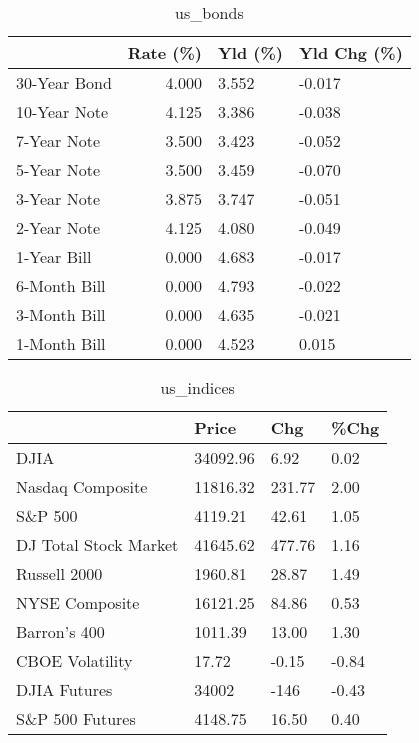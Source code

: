\documentclass{article}%
\begin{document}
\begin{table}[htbp]%
\caption{us\_bonds}%
\centering%
\begin{adjustbox}{width=1\textwidth}%
\begin{tabular}{lrll}
\toprule
             &  Rate (\%) & Yld (\%) & Yld Chg (\%) \\
\midrule
30-Year Bond &     4.000 &   3.552 &      -0.017 \\
10-Year Note &     4.125 &   3.386 &      -0.038 \\
 7-Year Note &     3.500 &   3.423 &      -0.052 \\
 5-Year Note &     3.500 &   3.459 &      -0.070 \\
 3-Year Note &     3.875 &   3.747 &      -0.051 \\
 2-Year Note &     4.125 &   4.080 &      -0.049 \\
 1-Year Bill &     0.000 &   4.683 &      -0.017 \\
6-Month Bill &     0.000 &   4.793 &      -0.022 \\
3-Month Bill &     0.000 &   4.635 &      -0.021 \\
1-Month Bill &     0.000 &   4.523 &       0.015 \\
\bottomrule
\end{tabular}
%
\end{adjustbox}%
\end{table}

%


\begin{table}[htbp]%
\caption{us\_indices}%
\centering%
\begin{adjustbox}{width=1\textwidth}%
\begin{tabular}{llll}
\toprule
                      &    Price &    Chg &  \%Chg \\
\midrule
                 DJIA & 34092.96 &   6.92 &  0.02 \\
     Nasdaq Composite & 11816.32 & 231.77 &  2.00 \\
              S\&P 500 &  4119.21 &  42.61 &  1.05 \\
DJ Total Stock Market & 41645.62 & 477.76 &  1.16 \\
         Russell 2000 &  1960.81 &  28.87 &  1.49 \\
       NYSE Composite & 16121.25 &  84.86 &  0.53 \\
         Barron's 400 &  1011.39 &  13.00 &  1.30 \\
      CBOE Volatility &    17.72 &  -0.15 & -0.84 \\
         DJIA Futures &    34002 &   -146 & -0.43 \\
      S\&P 500 Futures &  4148.75 &  16.50 &  0.40 \\
\bottomrule
\end{tabular}
%
\end{adjustbox}%
\end{table}
\end{document}
